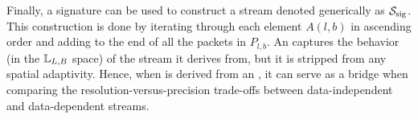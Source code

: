 Finally, a signature can be used to construct a stream denoted generically as $\ssig$. This
construction is done by iterating through each element $A(l,b)$ in ascending order and adding to the
end of \ssig all the packets in $P_{l,b}$. An \ssig captures the behavior (in the ${\mathbb L}_{L,B}$
space) of the stream it derives from, but it is stripped from any spatial adaptivity. Hence, when
\ssig is derived from an \sopt, it can serve as a bridge when comparing the
resolution-versus-precision trade-offs between data-independent and data-dependent streams.